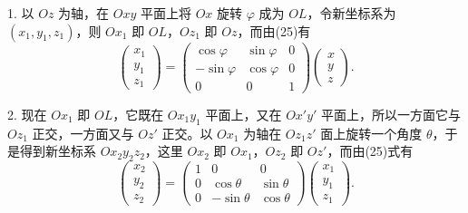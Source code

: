 1. 以 $Oz$ 为轴，在 $Oxy$ 平面上将 $Ox$ 旋转 $\varphi$ 成为 $OL$，令新坐标系为 $(x_1,y_1,z_1)$，则 $Ox_1$ 即 $OL$，$Oz_1$ 即 $Oz$，而由(25)有
\begin{equation}
 \begin{pmatrix}x_1\\y_1\\z_1\end{pmatrix}
 =\begin{pmatrix}
 \cos\varphi&\sin\varphi&0\\
 -\sin\varphi&\cos\varphi&0\\
 0&0&1
 \end{pmatrix}
 \begin{pmatrix}x\\y\\z\end{pmatrix}.
 \tag{26}
\end{equation}

2. 现在 $Ox_1$ 即 $OL$，它既在 $Ox_1y_1$ 平面上，又在 $Ox'y'$ 平面上，所以一方面它与 $Oz_1$ 正交，一方面又与 $Oz'$ 正交。以 $Ox_1$ 为轴在 $Oz_1z'$ 面上旋转一个角度 $\theta$，于是得到新坐标系 $Ox_2y_2z_2$，这里 $Ox_2$ 即 $Ox_1$，$Oz_2$ 即 $Oz'$，而由(25)式有
\begin{equation}
 \begin{pmatrix}x_2\\y_2\\z_2\end{pmatrix}
 =\begin{pmatrix}
 1&0&0\\
 0&\cos\theta&\sin\theta\\
 0&-\sin\theta&\cos\theta
 \end{pmatrix}
 \begin{pmatrix}x_1\\y_1\\z_1\end{pmatrix}.
 \tag{27}
\end{equation}

